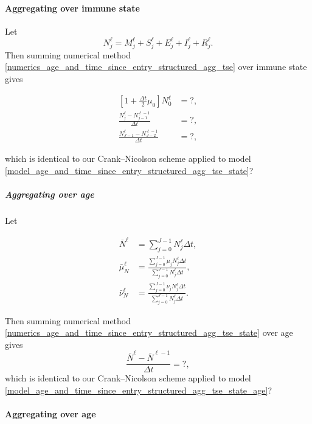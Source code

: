 \documentclass{jpmarticle}
\let\subequationsorig\subequations%
\let\endsubequationsorig\endsubequations%
\renewenvironment{subequations}{
  \subequationsorig
  \renewcommand{\theequation}{\theparentequation.\arabic{equation}}
}{
  \endsubequationsorig
}
\begin{document}
\paragraph{Aggregating over immune state}

Let
\begin{equation}
  N_j^{\ell}
  = M_j^{\ell} + S_j^{\ell} + E_j^{\ell} + I_j^{\ell} + R_j^{\ell}.
\end{equation}
Then summing numerical method
\eqref{numerics_age_and_time_since_entry_structured_agg_tse} over
immune state gives
\begin{subequations}
  \label{numerics_age_and_time_since_entry_structured_agg_tse_state}
  \begin{align}
    \left[1 + \frac{\Delta t}{2} \mu_0\right] N_0^{\ell}
    &= ?,
    \\
    \frac{N_j^{\ell} - N_{j - 1}^{\ell - 1}}{\Delta t}
    &= ?,
    \\
    \frac{N_{J - 1}^{\ell} - N_{J - 2}^{\ell - 1}}{\Delta t}
    &= ?,
  \end{align}
\end{subequations}
which is identical to our Crank--Nicolson scheme applied to model
\eqref{model_age_and_time_since_entry_structured_agg_tse_state}?


\subparagraph{Aggregating over age}

Let
\begin{subequations}
  \begin{align}
    \bar{N}^{\ell}
    &= \sum_{j = 0}^{J - 1} N_j^{\ell} \Delta t,
    \\
    \bar{\mu}_N^{\ell}
    &= \frac{\sum_{j = 0}^{J - 1} \mu_j N_j^{\ell} \Delta t}
    {\sum_{j = 0}^{J - 1} N_j^{\ell} \Delta t},
    \\
    \bar{\nu}_N^{\ell}
    &= \frac{\sum_{j = 0}^{J - 1} \nu_j N_j^{\ell} \Delta t}
    {\sum_{j = 0}^{J - 1} N_j^{\ell} \Delta t}.
  \end{align}
\end{subequations}
Then summing numerical method
\eqref{numerics_age_and_time_since_entry_structured_agg_tse_state}
over age gives
\begin{equation}
  \label{numerics_age_and_time_since_entry_structured_agg_tse_state_age}
  \frac{\bar{N}^{\ell} - \bar{N}^{\ell - 1}}{\Delta t}
  = ?,
\end{equation}
which is identical to our Crank--Nicolson scheme applied to model
\eqref{model_age_and_time_since_entry_structured_agg_tse_state_age}?


\paragraph{Aggregating over age}
\end{document}
